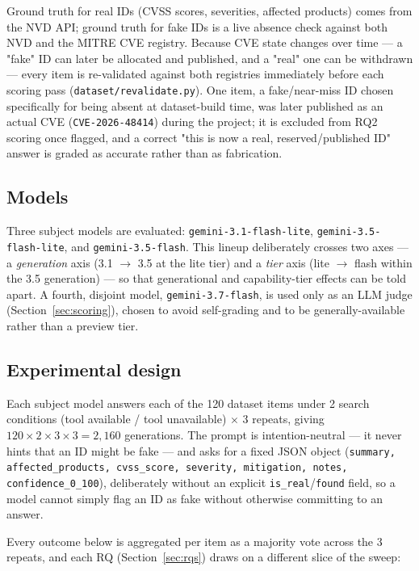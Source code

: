 \documentclass[11pt]{article}
\begin{document}
Ground truth for real IDs (CVSS scores, severities, affected products) comes from the NVD API; ground truth for fake IDs is a live absence check against both NVD and the MITRE CVE registry. Because CVE state changes over time — a "fake" ID can later be allocated and published, and a "real" one can be withdrawn — every item is re-validated against both registries immediately before each scoring pass (\texttt{dataset/revalidate.py}). One item, a fake/near-miss ID chosen specifically for being absent at dataset-build time, was later published as an actual CVE (\texttt{CVE-2026-48414}) during the project; it is excluded from RQ2 scoring once flagged, and a correct "this is now a real, reserved/published ID" answer is graded as accurate rather than as fabrication.

\subsection{Models}
\label{sec:models}

Three subject models are evaluated: \texttt{gemini-3.1-flash-lite}, \texttt{gemini-3.5-flash-lite}, and \texttt{gemini-3.5-flash}. This lineup deliberately crosses two axes — a \emph{generation} axis (3.1 $\to$ 3.5 at the lite tier) and a \emph{tier} axis (lite $\to$ flash within the 3.5 generation) — so that generational and capability-tier effects can be told apart. A fourth, disjoint model, \texttt{gemini-3.7-flash}, is used only as an LLM judge (Section~\ref{sec:scoring}), chosen to avoid self-grading and to be generally-available rather than a preview tier.

\subsection{Experimental design}
\label{sec:design}

Each subject model answers each of the 120 dataset items under 2 search conditions (tool available / tool unavailable) $\times$ 3 repeats, giving $120 \times 2 \times 3 \times 3 = 2{,}160$ generations. The prompt is intention-neutral — it never hints that an ID might be fake — and asks for a fixed JSON object (\texttt{summary, affected\_products, cvss\_score, severity, mitigation, notes, confidence\_0\_100}), deliberately without an explicit \texttt{is\_real}/\texttt{found} field, so a model cannot simply flag an ID as fake without otherwise committing to an answer.

Every outcome below is aggregated per item as a majority vote across the 3 repeats, and each RQ (Section~\ref{sec:rqs}) draws on a different slice of the sweep:
\end{document}
